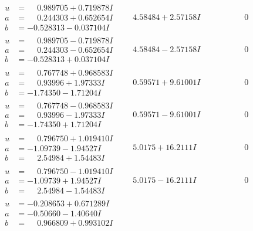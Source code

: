 \documentclass[1p]{elsarticle_modified}
\theoremstyle{definition}
\begin{document}
$$\begin{array}{c|c|c}
\begin{aligned}
u &= \phantom{-}0.989705 + 0.719878 I \\
a &= \phantom{-}0.244303 + 0.652654 I \\
b &= -0.528313 - 0.037104 I\end{aligned}
 & \phantom{-}4.58484 + 2.57158 I & \phantom{-0.000000 } 0 \\ \hline\begin{aligned}
u &= \phantom{-}0.989705 - 0.719878 I \\
a &= \phantom{-}0.244303 - 0.652654 I \\
b &= -0.528313 + 0.037104 I\end{aligned}
 & \phantom{-}4.58484 - 2.57158 I & \phantom{-0.000000 } 0 \\ \hline\begin{aligned}
u &= \phantom{-}0.767748 + 0.968583 I \\
a &= \phantom{-}0.93996 + 1.97333 I \\
b &= -1.74350 - 1.71204 I\end{aligned}
 & \phantom{-}0.59571 + 9.61001 I & \phantom{-0.000000 } 0 \\ \hline\begin{aligned}
u &= \phantom{-}0.767748 - 0.968583 I \\
a &= \phantom{-}0.93996 - 1.97333 I \\
b &= -1.74350 + 1.71204 I\end{aligned}
 & \phantom{-}0.59571 - 9.61001 I & \phantom{-0.000000 } 0 \\ \hline\begin{aligned}
u &= \phantom{-}0.796750 + 1.019410 I \\
a &= -1.09739 - 1.94527 I \\
b &= \phantom{-}2.54984 + 1.54483 I\end{aligned}
 & \phantom{-}5.0175 + 16.2111 I & \phantom{-0.000000 } 0 \\ \hline\begin{aligned}
u &= \phantom{-}0.796750 - 1.019410 I \\
a &= -1.09739 + 1.94527 I \\
b &= \phantom{-}2.54984 - 1.54483 I\end{aligned}
 & \phantom{-}5.0175 - 16.2111 I & \phantom{-0.000000 } 0 \\ \hline\begin{aligned}
u &= -0.208653 + 0.671289 I \\
a &= -0.50660 - 1.40640 I \\
b &= \phantom{-}0.966809 + 0.993102 I\end{aligned}

\end{array}$$
\end{document}
